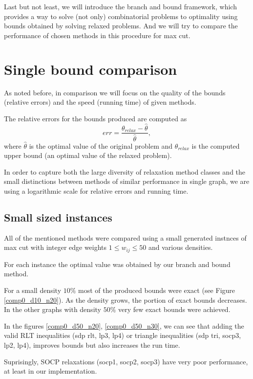 \documentclass[12pt]{book}
\theoremstyle{definition}
\begin{document}
Last but not least, we will introduce the branch and bound framework, which provides a way to solve (not only) combinatorial problems to optimality using bounds obtained by solving relaxed problems. And we will try to compare the performance of chosen methods in this procedure for max cut.

\section{Single bound comparison}

As noted before, in comparison we will focus on the quality of the bounds (relative errors) and the speed (running time) of given methods.

The relative errors for the bounds produced are computed as 
\begin{equation}
\label{relative_error}
err = \frac{\theta_{relax} - \hat{\theta}}{\hat{\theta}},
\end{equation}
where $\hat{\theta}$ is the optimal value of the original problem and $\theta_{relax}$ is the computed upper bound (an optimal value of the relaxed problem). 

In order to capture both the large diversity of relaxation method classes and the small distinctions between methods of similar performance in single graph, we are using a logarithmic scale for relative errors and running time. 



\subsection{Small sized instances}
All of the mentioned methods were compared using a small generated instnces of max cut with integer edge weights $1\leq w_{ij}\leq 50$
and various densities. 

For each instance the optimal value was obtained by our branch and bound method. 

For a small density $10\%$ most of the produced bounds were exact (see Figure \ref{comp0_d10_n20}). 
As the density grows, the portion of exact bounds decreases. In the other graphs with density $50\%$ very few exact bounds were achieved.

In the figures \ref{comp0_d50_n20}, \ref{comp0_d50_n30}, we can see that adding the valid RLT inequalities (sdp rlt, lp3, lp4) or triangle inequalities (sdp tri, socp3, lp2, lp4), improves bounds but also increases the run time.

Suprisingly, SOCP relaxations (socp1, socp2, socp3) have very poor performance, at least in our implementation.
\end{document}
